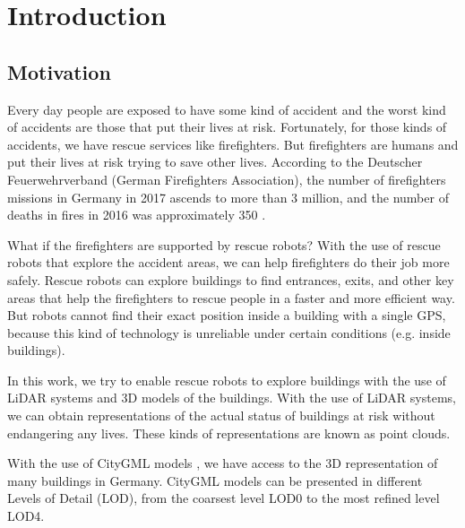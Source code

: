 

    \chapter{Introduction}

    \section{Motivation}
    
        Every day people are exposed to have some kind of accident and the worst kind of accidents are those that put their lives at risk.
        Fortunately, for those kinds of accidents, we have rescue services like firefighters.
        But firefighters are humans and put their lives at risk trying to save other lives.
        According to the Deutscher Feuerwehrverband (German Firefighters Association), the number of firefighters missions in Germany in 2017 
        ascends to more than 3 million, and the number of deaths in fires in 2016 was approximately 350 \cite{DeutscherFeuerweherverband_online}.
        \par
        What if the firefighters are supported by rescue robots?
        With the use of rescue robots that explore the accident areas, we can help firefighters do their job more safely.
        Rescue robots can explore buildings to find entrances, exits, and other key areas that help the firefighters to rescue people in a faster and more efficient way.
        But robots cannot find their exact position inside a building with a single GPS, because this kind of technology is unreliable under certain conditions 
        (e.g. inside buildings).
        \par
        In this work, we try to enable rescue robots to explore buildings with the use of LiDAR systems and 3D models of the buildings.
        With the use of LiDAR systems, we can obtain representations of the actual status of buildings at risk without endangering any lives. 
        These kinds of representations are known as point clouds.
        \par
        With the use of CityGML models \cite{Groger_2012_OGC}, we have access to the 3D representation of many buildings in Germany.
        CityGML models can be presented in different Levels of Detail (LOD), from the coarsest level LOD0 to the most refined level LOD4.
